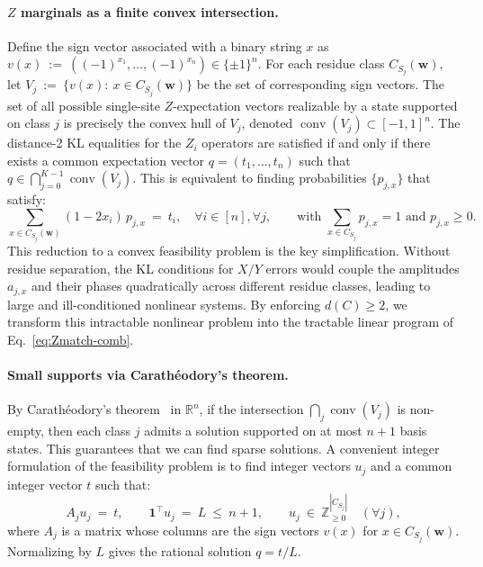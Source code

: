 \documentclass[pdflatex,sn-nature]{sn-jnl}%
\theoremstyle{thmstyleone}%
\theoremstyle{thmstyletwo}%
\theoremstyle{thmstylethree}%
\begin{document}
\paragraph{$Z$ marginals as a finite convex intersection.}
Define the sign vector associated with a binary string $x$ as $v(x)\ :=\ ((-1)^{x_1},\dots,(-1)^{x_n})\in\{\pm1\}^n$. For each residue class $C_{S_j}(\mathbf w)$, let $V_j\ :=\ \{v(x):\ x\in C_{S_j}(\mathbf w) \}$ be the set of corresponding sign vectors. The set of all possible single-site $Z$-expectation vectors realizable by a state supported on class $j$ is precisely the convex hull of $V_j$, denoted $\operatorname{conv}(V_j)\subset[-1,1]^n$. The distance-2 KL equalities for the $Z_i$ operators are satisfied if and only if there exists a common expectation vector $q=(t_1,\dots,t_n)$ such that $q \in \bigcap_{j=0}^{K-1}\operatorname{conv}(V_j)$. This is equivalent to finding probabilities $\{p_{j,x}\}$ that satisfy:
\begin{equation}
    \label{eq:Zmatch-comb}
    \sum_{x\in C_{S_j}(\mathbf w)} (1-2x_i)\,p_{j,x}\ =\ t_i,
    \quad \forall i\in[n], \forall j,\qquad
    \text{with } \sum_{x\in C_{S_j}} p_{j,x}=1 \text{ and } p_{j,x}\ge 0.
\end{equation}
This reduction to a convex feasibility problem is the key simplification. Without residue separation, the KL conditions for $X/Y$ errors would couple the amplitudes $a_{j,x}$ and their phases quadratically across different residue classes, leading to large and ill-conditioned nonlinear systems. By enforcing $d(C)\ge 2$, we transform this intractable nonlinear problem into the tractable linear program of Eq.~\eqref{eq:Zmatch-comb}.

\paragraph{Small supports via Carath\'eodory's theorem.}
By Carath\'eodory's theorem~\cite{Caratheodory1907Uber} in $\mathbb{R}^n$, if the intersection $\bigcap_j\operatorname{conv}(V_j)$ is non-empty, then each class $j$ admits a solution supported on at most $n+1$ basis states. This guarantees that we can find sparse solutions. A convenient integer formulation of the feasibility problem is to find integer vectors $u_j$ and a common integer vector $t$ such that:
\begin{equation}
    \label{eq:int-feas-comb}
    A_j u_j\ =\ t,\qquad \mathbf 1^\top u_j\ =\ L\ \le\ n+1,\qquad
    u_j\ \in\ \mathbb{Z}_{\ge 0}^{|C_{S_j}|}\quad (\forall j),
\end{equation}
where $A_j$ is a matrix whose columns are the sign vectors $v(x)$ for $x\in C_{S_j}(\mathbf w)$. Normalizing by $L$ gives the rational solution $q=t/L$.
\end{document}
